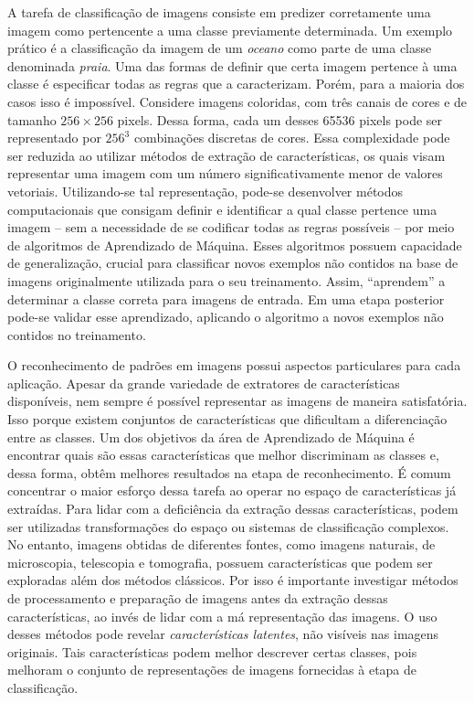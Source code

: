 
A tarefa de classificação de imagens consiste em predizer corretamente uma imagem como pertencente a uma classe previamente determinada. Um exemplo prático é a classificação da imagem de um \textit{oceano} como parte de uma classe denominada \textit{praia}. Uma das formas de definir que certa imagem pertence à uma classe é especificar todas as regras que a caracterizam.
Porém, para a maioria dos casos isso é impossível. Considere imagens coloridas, com três canais de cores e de tamanho $256\times256$ pixels. Dessa forma, cada um desses 65536 pixels pode ser representado por $256^3$ combinações discretas de cores. Essa complexidade pode ser reduzida ao utilizar métodos de extração de características, os quais visam representar uma imagem com um número significativamente menor de valores vetoriais. Utilizando-se tal representação, pode-se desenvolver métodos computacionais que consigam definir e identificar a qual classe pertence uma imagem -- sem a necessidade de se codificar todas as regras possíveis -- por meio de algoritmos de Aprendizado de Máquina. Esses algoritmos possuem capacidade de generalização, crucial para classificar novos exemplos não contidos na base de imagens originalmente utilizada para o seu treinamento. Assim, ``aprendem'' a determinar a classe correta para imagens de entrada. Em uma etapa posterior pode-se validar esse aprendizado, aplicando o algoritmo a novos exemplos não contidos no treinamento.

O reconhecimento de padrões em imagens possui aspectos particulares para cada aplicação. Apesar da grande variedade de extratores de características disponíveis, nem sempre é possível representar as imagens de maneira satisfatória. Isso porque existem conjuntos de características que dificultam a diferenciação entre as classes. Um dos objetivos da área de Aprendizado de Máquina é encontrar quais são essas características que melhor discriminam as classes e, dessa forma, obtêm melhores resultados na etapa de reconhecimento. É comum concentrar o maior esforço dessa tarefa ao operar no espaço de características já extraídas. Para lidar com a deficiência da extração dessas características, podem ser utilizadas transformações do espaço ou sistemas de classificação complexos. No entanto, imagens obtidas de diferentes fontes, como imagens naturais, de microscopia, telescopia e tomografia, possuem características que podem ser exploradas além dos métodos clássicos. Por isso é importante investigar métodos de processamento e preparação de imagens antes da extração dessas características, ao invés de lidar com a má representação das imagens. O uso desses métodos pode revelar \textit{características latentes}, não visíveis nas imagens originais. Tais características podem melhor descrever certas classes, pois melhoram o conjunto de representações de imagens fornecidas à etapa de classificação.

